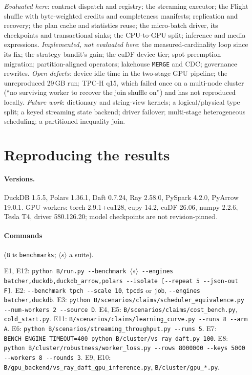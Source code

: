 \documentclass[10pt,twocolumn,letterpaper]{article}   %
\newcommand{\E}[1]{\textsf{E#1}}
\begin{document}
\emph{Evaluated here}: contract dispatch and registry; the streaming executor; the Flight
shuffle with byte-weighted credits and completeness manifests; replication and recovery; the
plan cache and statistics reuse; the micro-batch driver, its checkpoints and transactional
sinks; the CPU-to-GPU split; inference and media expressions. \emph{Implemented, not evaluated
here}: the measured-cardinality loop since its fix; the strategy bandit's gain; the cuDF device
tier; spot-preemption migration; partition-aligned operators; lakehouse \texttt{MERGE} and CDC;
governance rewrites. \emph{Open defects}: device idle time in the two-stage GPU pipeline; the
unreproduced 29\,GB run; TPC-H q15, which failed once on a multi-node cluster (``no surviving
worker to recover the join shuffle on'') and has not reproduced locally. \emph{Future work}: dictionary and string-view kernels; a logical/physical type split;
a keyed streaming state backend; driver failover; multi-stage heterogeneous scheduling; a
partitioned inequality join.

\section{Reproducing the results}
\label{sec:appendix-protocol}

\paragraph{Versions.} DuckDB 1.5.5, Polars 1.36.1, Daft 0.7.24, Ray 2.58.0, PySpark 4.2.0,
PyArrow 19.0.1. GPU workers: torch 2.9.1+cu128, cupy 14.2, cuDF 26.06, numpy 2.2.6, Tesla T4,
driver 580.126.20; model checkpoints are not revision-pinned.

\paragraph{Commands} (\texttt{B} is \texttt{benchmarks}; $\langle s\rangle$ a suite).
{\scriptsize\raggedright
\E{1}, \E{12}: \texttt{python B/run.py -{}-benchmark $\langle s\rangle$ -{}-engines batcher,duckdb,duckdb\_arrow,polars -{}-isolate [-{}-repeat 5 -{}-json-out F]}.
\E{2}: \texttt{-{}-benchmark tpch -{}-scale 10}, \texttt{tpcds} or \texttt{job}, \texttt{-{}-engines batcher,duckdb}.
\E{3}: \texttt{python B/scenarios/claims/scheduler\_equivalence.py -{}-num-workers 2 -{}-source D}.
\E{4}, \E{5}: \texttt{B/scenarios/claims/cost\_bench.py}, \texttt{cold\_start.py}.
\E{11}: \texttt{B/scenarios/claims/learning\_curve.py -{}-runs 8 -{}-arm A}.
\E{6}: \texttt{python B/scenarios/streaming\_throughput.py -{}-runs 5}.
\E{7}: \texttt{BENCH\_ENGINE\_TIMEOUT=400 python B/cluster/vs\_ray\_daft.py 100}.
\E{8}: \texttt{python B/cluster/robustness/worker\_loss.py -{}-rows 8000000 -{}-keys 5000 -{}-workers 8 -{}-rounds 3}.
\E{9}, \E{10}: \texttt{B/gpu\_backend/vs\_ray\_daft\_gpu\_inference.py}, \texttt{B/cluster/gpu\_*.py}.\par}
\end{document}
